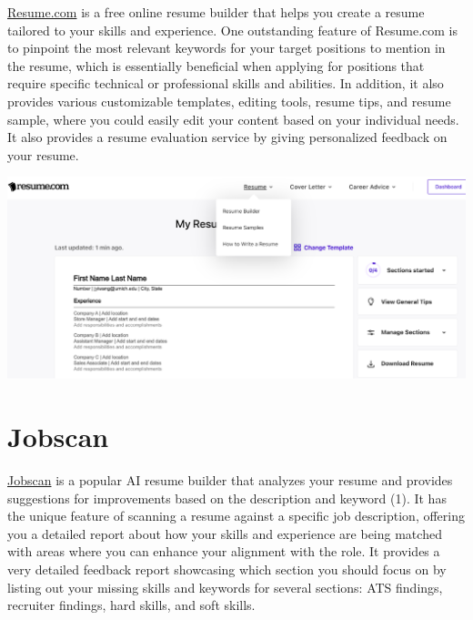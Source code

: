 \documentclass[
]{book}
\begin{document}
\href{https://www.resume.com/resume/builder/783ccdad-f0ea-4ff0-aa57-c59d6100995a}{Resume.com} is a free online resume builder that helps you create a resume tailored to your skills and experience. One outstanding feature of Resume.com is to pinpoint the most relevant keywords for your target positions to mention in the resume, which is essentially beneficial when applying for positions that require specific technical or professional skills and abilities. In addition, it also provides various customizable templates, editing tools, resume tips, and resume sample, where you could easily edit your content based on your individual needs. It also provides a resume evaluation service by giving personalized feedback on your resume.

\includegraphics[width=5.90625in,height=\textheight]{Resume.com pic.png}

\hypertarget{jobscan}{%
\section{Jobscan}\label{jobscan}}

\href{https://www.jobscan.co/resume-score}{Jobscan} is a popular AI resume builder that analyzes your resume and provides suggestions for improvements based on the description and keyword (1). It has the unique feature of scanning a resume against a specific job description, offering you a detailed report about how your skills and experience are being matched with areas where you can enhance your alignment with the role. It provides a very detailed feedback report showcasing which section you should focus on by listing out your missing skills and keywords for several sections: ATS findings, recruiter findings, hard skills, and soft skills.
\end{document}
